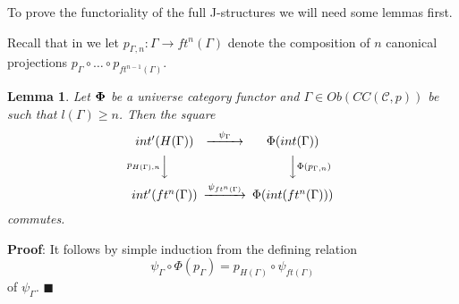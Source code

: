 \documentclass[12pt]{article}
\numberwithin{equation}{section}
\newenvironment{myproof}{{\bf Proof}:}{$\blacksquare$ \vskip 5mm }
\newtheorem{lemma}[proposition]{Lemma}
\newcommand{\llabel}[1]{\label{#1}}
\newcommand{\sr}{\rightarrow}
\newcommand{\toCC}{CC} %
\begin{document}
To prove the functoriality of the full J-structures we will need some lemmas
first.

Recall that in \cite{Csubsystems} we let $p_{\Gamma,n}:\Gamma\sr ft^n(\Gamma)$
denote the composition of $n$ canonical projections $p_{\Gamma}\circ \dots\circ
p_{ft^{n-1}(\Gamma)}$.
%
\begin{lemma}
\llabel{2015.05.10.l1} Let ${\bf\Phi}$ be a universe category functor and
$\Gamma\in Ob(\toCC({\mathcal C},p))$ be such that $l(\Gamma)\ge n$. Then the
square
%
$$
\begin{CD}
int'(H(\Gamma)) @>\psi_{\Gamma}>> \Phi(int(\Gamma))\\ @Vp_{H(\Gamma),n} VV
@VV\Phi(p_{\Gamma,n})V\\ int'(ft^n(\Gamma)) @>\psi_{ft^n(\Gamma)}>>
\Phi(int(ft^n(\Gamma)))
\end{CD}
$$
%
commutes.
\end{lemma}
%
\begin{myproof}
It follows by simple induction from the defining relation
%
$$\psi_{\Gamma}\circ \Phi(p_{\Gamma})=p_{H(\Gamma)}\circ \psi_{ft(\Gamma)}$$
%
of $\psi_{\Gamma}$.
\end{myproof}
\end{document}
